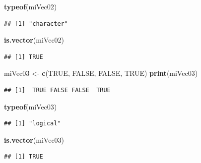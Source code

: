 \documentclass[
]{book}
\newenvironment{Shaded}{\begin{snugshade}}{\end{snugshade}}
\newcommand{\KeywordTok}[1]{\textcolor[rgb]{0.13,0.29,0.53}{\textbf{#1}}}
\newcommand{\NormalTok}[1]{#1}
\newcommand{\OtherTok}[1]{\textcolor[rgb]{0.56,0.35,0.01}{#1}}
\newcommand{\StringTok}[1]{\textcolor[rgb]{0.31,0.60,0.02}{#1}}
\begin{document}
\begin{Shaded}
\begin{Highlighting}[]
\KeywordTok{typeof}\NormalTok{(miVec02)}
\end{Highlighting}
\end{Shaded}

\begin{verbatim}
## [1] "character"
\end{verbatim}

\begin{Shaded}
\begin{Highlighting}[]
\KeywordTok{is.vector}\NormalTok{(miVec02)}
\end{Highlighting}
\end{Shaded}

\begin{verbatim}
## [1] TRUE
\end{verbatim}

\begin{Shaded}
\begin{Highlighting}[]
\NormalTok{miVec03 <-}\StringTok{ }\KeywordTok{c}\NormalTok{(}\OtherTok{TRUE}\NormalTok{, }\OtherTok{FALSE}\NormalTok{, }\OtherTok{FALSE}\NormalTok{, }\OtherTok{TRUE}\NormalTok{)}
\KeywordTok{print}\NormalTok{(miVec03)}
\end{Highlighting}
\end{Shaded}

\begin{verbatim}
## [1]  TRUE FALSE FALSE  TRUE
\end{verbatim}

\begin{Shaded}
\begin{Highlighting}[]
\KeywordTok{typeof}\NormalTok{(miVec03)}
\end{Highlighting}
\end{Shaded}

\begin{verbatim}
## [1] "logical"
\end{verbatim}

\begin{Shaded}
\begin{Highlighting}[]
\KeywordTok{is.vector}\NormalTok{(miVec03)}
\end{Highlighting}
\end{Shaded}

\begin{verbatim}
## [1] TRUE
\end{verbatim}
\end{document}
